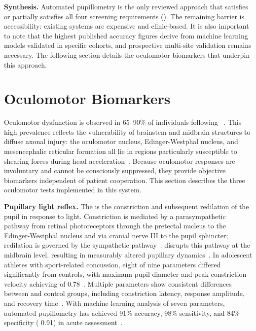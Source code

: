 \textbf{Synthesis.} Automated pupillometry is the only reviewed approach that satisfies or partially satisfies all four screening requirements (). The remaining barrier is accessibility: existing systems are expensive and clinic-based. It is also important to note that the highest published accuracy figures derive from machine learning models validated in specific cohorts, and prospective multi-site validation remains necessary. The following section details the oculomotor biomarkers that underpin this approach.


\section{Oculomotor Biomarkers}
\label{sec:bg-oculomotor}

Oculomotor dysfunction is observed in 65--90\% of individuals following ~\cite{mcdonald2022eye}. This high prevalence reflects the vulnerability of brainstem and midbrain structures to diffuse axonal injury: the oculomotor nucleus, Edinger-Westphal nucleus, and mesencephalic reticular formation all lie in regions particularly susceptible to shearing forces during head acceleration~\cite{hirad2019neural}. Because oculomotor responses are involuntary and cannot be consciously suppressed, they provide objective biomarkers independent of patient cooperation. This section describes the three oculomotor tests implemented in this system.

\textbf{Pupillary light reflex.} The  is the constriction and subsequent redilation of the pupil in response to light. Constriction is mediated by a parasympathetic pathway from retinal photoreceptors through the pretectal nucleus to the Edinger-Westphal nucleus and via cranial nerve III to the pupil sphincter; redilation is governed by the sympathetic pathway~\cite{ciuffreda2017plr}.  disrupts this pathway at the midbrain level, resulting in measurably altered pupillary dynamics~\cite{bruggeman2020tai}. In adolescent athletes with sport-related concussion, eight of nine  parameters differed significantly from controls, with maximum pupil diameter and peak constriction velocity achieving  of 0.78~\cite{master2020pupillary}. Multiple  parameters show consistent differences between  and control groups, including constriction latency, response amplitude, and recovery time~\cite{ciuffreda2017plr}. With machine learning analysis of seven  parameters, automated pupillometry has achieved 91\% accuracy, 98\% sensitivity, and 84\% specificity ( 0.91) in acute assessment~\cite{maxin2024smartphone}.


